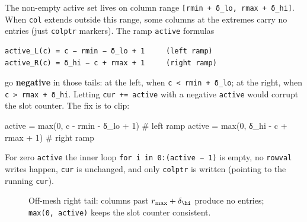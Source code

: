 \documentclass[
]{article}
\newenvironment{Shaded}{\begin{snugshade}}{\end{snugshade}}
\newcommand{\CommentTok}[1]{\textcolor[rgb]{0.37,0.37,0.37}{#1}}
\newcommand{\FloatTok}[1]{\textcolor[rgb]{0.68,0.00,0.00}{#1}}
\newcommand{\FunctionTok}[1]{\textcolor[rgb]{0.28,0.35,0.67}{#1}}
\newcommand{\NormalTok}[1]{\textcolor[rgb]{0.00,0.23,0.31}{#1}}
\newcommand{\OperatorTok}[1]{\textcolor[rgb]{0.37,0.37,0.37}{#1}}
\begin{document}
The non-empty active set lives on column range
\texttt{{[}rmin\ +\ δ\_lo,\ rmax\ +\ δ\_hi{]}}. When \texttt{col}
extends outside this range, some columns at the extremes carry no
entries (just \texttt{colptr} markers). The ramp \texttt{active}
formulas

\begin{verbatim}
active_L(c) = c − rmin − δ_lo + 1     (left ramp)
active_R(c) = δ_hi − c + rmax + 1     (right ramp)
\end{verbatim}

go \textbf{negative} in those tails: at the left, when
\texttt{c\ \textless{}\ rmin\ +\ δ\_lo}; at the right, when
\texttt{c\ \textgreater{}\ rmax\ +\ δ\_hi}. Letting
\texttt{cur\ +=\ active} with a negative \texttt{active} would corrupt
the slot counter. The fix is to clip:

\begin{Shaded}
\begin{Highlighting}[]
\NormalTok{active }\OperatorTok{=} \FunctionTok{max}\NormalTok{(}\FloatTok{0}\NormalTok{, c }\OperatorTok{{-}}\NormalTok{ rmin }\OperatorTok{{-}}\NormalTok{ δ\_lo }\OperatorTok{+} \FloatTok{1}\NormalTok{)   }\CommentTok{\# left ramp}
\NormalTok{active }\OperatorTok{=} \FunctionTok{max}\NormalTok{(}\FloatTok{0}\NormalTok{, δ\_hi }\OperatorTok{{-}}\NormalTok{ c }\OperatorTok{+}\NormalTok{ rmax }\OperatorTok{+} \FloatTok{1}\NormalTok{)   }\CommentTok{\# right ramp}
\end{Highlighting}
\end{Shaded}

For zero \texttt{active} the inner loop
\texttt{for\ i\ in\ 0:(active\ −\ 1)} is empty, no \texttt{rowval}
writes happen, \texttt{cur} is unchanged, and only \texttt{colptr} is
written (pointing to the running \texttt{cur}).

\begin{figure}[h]
\centering
{}
\caption{Off-mesh right tail: columns past $r_{\max}+\delta_{\hi}$ produce no entries; \texttt{max(0, active)} keeps the slot counter consistent.}
\end{figure}
\end{document}
